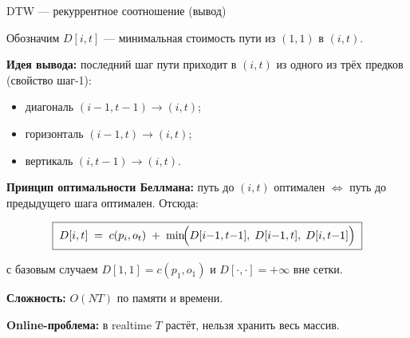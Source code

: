 \begin{frame}{DTW --- рекуррентное соотношение (вывод)}

Обозначим $D[i, t]$ --- минимальная стоимость пути из $(1,1)$ в $(i, t)$.

\bigskip

\textbf{Идея вывода:} последний шаг пути приходит в $(i, t)$ из одного
из трёх предков (свойство шаг-1):

\begin{itemize}
  \item диагональ $(i{-}1, t{-}1) \to (i, t)$;
  \item горизонталь $(i{-}1, t) \to (i, t)$;
  \item вертикаль $(i, t{-}1) \to (i, t)$.
\end{itemize}

\bigskip

\textbf{Принцип оптимальности Беллмана:} путь до $(i, t)$ оптимален
$\Longleftrightarrow$ путь до предыдущего шага оптимален. Отсюда:

\[
\boxed{\;
D[i, t] \;=\; c(p_i, o_t) \;+\;
\min\!\Bigl(D[i{-}1, t{-}1],\; D[i{-}1, t],\; D[i, t{-}1]\Bigr)\;}
\]

с базовым случаем $D[1,1] = c(p_1, o_1)$ и $D[\cdot, \cdot] = +\infty$
вне сетки.

\bigskip

\textbf{Сложность:} $O(NT)$ по памяти и времени.

\textbf{Online-проблема:} в realtime $T$ растёт, нельзя хранить весь
массив. 

\end{frame}
